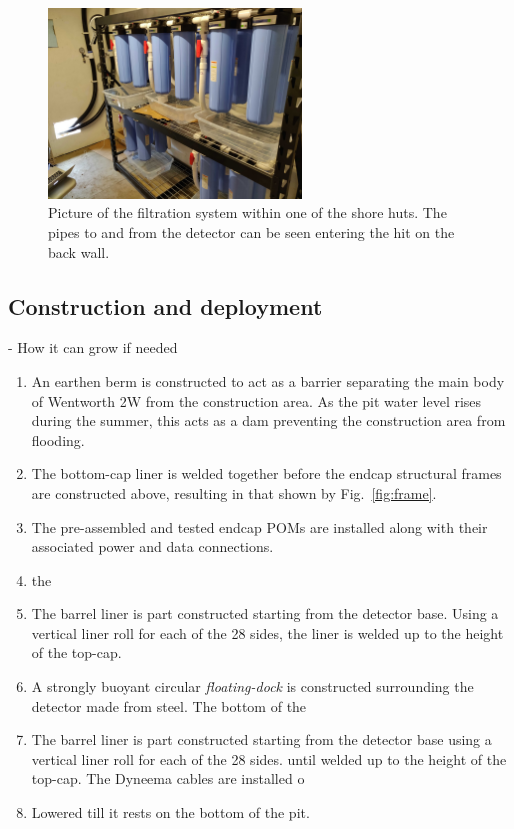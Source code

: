 \begin{figure} %
    \includegraphics[width=0.6\textwidth]{diagrams/4-chips/filtration.jpg}
    \caption[Picture of the \chipsfive filtration system.]
    {Picture of the \chipsfive filtration system within one of the shore huts. The pipes to and
        from the detector can be seen entering the hit on the back wall.}
    \label{fig:filtration}
\end{figure}

\subsection{Construction and deployment} %
\label{sec:chips_detector_deployment} %

- How it can grow if needed

\begin{enumerate}
    \item An earthen berm is constructed to act as a barrier separating the main body of Wentworth
          2W from the construction area. As the pit water level rises during the summer, this acts as a
          dam preventing the construction area from flooding.
    \item The bottom-cap liner is welded together before the endcap structural frames are
          constructed above, resulting in that shown by Fig.~\ref{fig:frame}.
    \item The pre-assembled and tested endcap POMs are installed along with their associated power
          and data connections.
    \item the


    \item The barrel liner is part constructed starting from the detector base. Using a vertical
          liner roll for each of the 28 sides, the liner is welded up to the height of the top-cap.
    \item A strongly buoyant circular \emph{floating-dock} is constructed surrounding the
          detector made from steel. The bottom of the


    \item The barrel liner is part constructed starting from the detector base using a vertical
          liner roll for each of the 28 sides.  until welded up to the height of the top-cap. The Dyneema cables
          are installed o


    \item Lowered till it rests on the bottom of the pit.
\end{enumerate}

